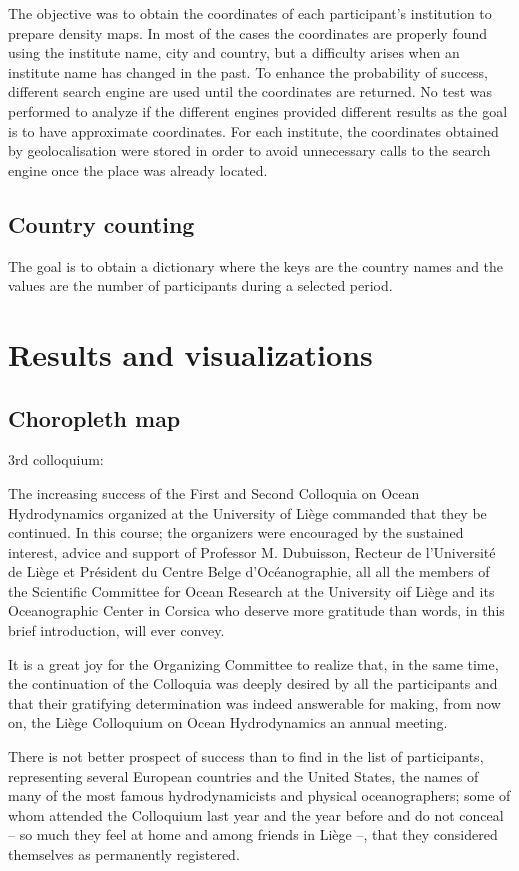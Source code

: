 \documentclass[12pt,a4paper,oneside,final]{article}
\begin{document}
The objective was to obtain the coordinates of each participant's institution to prepare density maps. In most of the cases the coordinates are properly found using the institute name, city and country, but a difficulty arises when an institute name has changed in the past. To enhance the probability of success, different search engine are used until the coordinates are returned. No test was performed to analyze if the different engines provided different results as the goal is to have approximate coordinates. For each institute, the coordinates obtained by geolocalisation were stored in order to avoid unnecessary calls to the search engine once the place was already located.

\subsection{Country counting}

The goal is to obtain a dictionary where the keys are the country names and the values are the number of participants during a selected period.


\section{Results and visualizations}

\subsection{Choropleth map}

3rd colloquium:

The increasing success of the First and Second Colloquia on Ocean Hydrodynamics organized at the University of Liège commanded that they be continued. In this course; the organizers were encouraged by the sustained interest, advice and support of Professor M. Dubuisson, Recteur de l'Université de Liège et Président du Centre Belge d'Océanographie, all all the members of the Scientific Committee for Ocean Research at the University oif Liège and its Oceanographic Center in Corsica who deserve more gratitude than words, in this brief introduction, will ever convey.

It is a great joy for the Organizing Committee to realize that, in the same time, the continuation of the Colloquia was deeply desired by all the participants and that their gratifying determination was indeed answerable for making, from now on, the Liège Colloquium on Ocean Hydrodynamics an annual meeting.

There is not better prospect of success than to find in the list of participants, representing several European countries and the United States, the names of many of the most famous hydrodynamicists and physical oceanographers; some of whom attended the Colloquium last year and the year before and do not conceal -- so much they feel at home and among friends in Liège --, that they considered themselves as permanently registered. 
\end{document}
